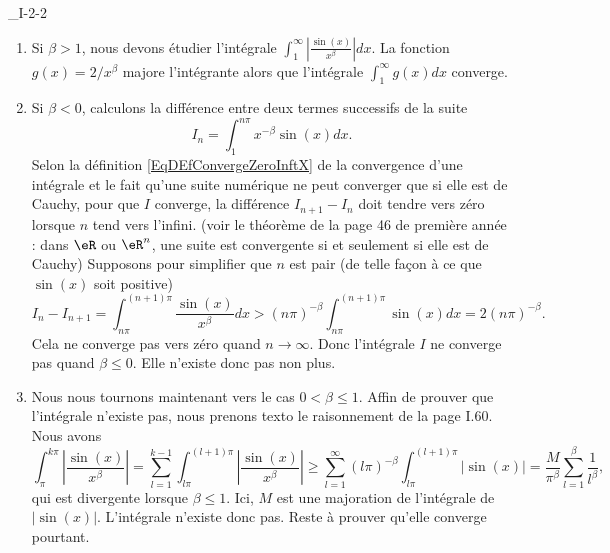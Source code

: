 

\begin{corrige}{_I-2-2}

\begin{enumerate}
\item Si $\beta>1$, nous devons étudier l'intégrale $\int_1^{\infty}\left| \frac{ \sin(x) }{ x^{\beta} }  \right|dx$. La fonction $g(x)=2/x^{\beta}$ majore l'intégrante alors que l'intégrale $\int_1^{\infty}g(x)dx$ converge.

\item Si $\beta<0$, calculons la différence entre deux termes successifs de la suite
\begin{equation}		\label{EqInACaclDiff}
	I_n=\int_1^{n\pi}x^{-\beta}\sin(x)dx.
\end{equation}
Selon la définition \eqref{EqDEfConvergeZeroInftX} de la convergence d'une intégrale et le fait qu'une suite numérique ne peut converger que si elle est de Cauchy, pour que $I$ converge, la différence $I_{n+1}-I_n$ doit tendre vers zéro lorsque $n$ tend vers l'infini. (voir le théorème de la page 46 de première année : dans $\eR$ ou $\eR^n$, une suite est convergente si et seulement si elle est de Cauchy) Supposons pour simplifier que $n$ est pair (de telle façon à ce que $\sin(x)$ soit positive)
\begin{equation}
	I_n-I_{n+1}=\int_{n\pi}^{(n+1)\pi}\frac{ \sin(x) }{ x^{\beta} }dx>(n\pi)^{-\beta}\int_{n\pi}^{(n+1)\pi}\sin(x)dx=2(n\pi)^{-\beta}.
\end{equation}
Cela ne converge pas vers zéro quand $n\to\infty$. Donc l'intégrale $I$ ne converge pas quand $\beta\leq 0$. Elle n'existe donc pas non plus.

\item Nous nous tournons maintenant vers le cas $0<\beta\leq 1$. Affin de prouver que l'intégrale n'existe pas, nous prenons texto le raisonnement de la page I.60. Nous avons
\begin{equation}
	\int_{\pi}^{k\pi}\left| \frac{ \sin(x) }{ x^{\beta} } \right|=\sum_{l=1}^{k-1}\int_{l\pi}^{(l+1)\pi}  \left| \frac{ \sin(x) }{ x^{\beta} } \right| \geq\sum_{l=1}^{\infty}(l\pi)^{-\beta} \int_{l\pi}^{(l+1)\pi}\left| \sin(x) \right|= \frac{ M }{ \pi^{\beta} }\sum_{l=1}^{\beta}\frac{1}{ l^{\beta} },
\end{equation}
qui est divergente lorsque $\beta\leq 1$. Ici, $M$ est une majoration de l'intégrale de $| \sin(x) |$. L'intégrale n'existe donc pas. Reste à prouver qu'elle converge pourtant.


\end{enumerate}
\end{corrige}
